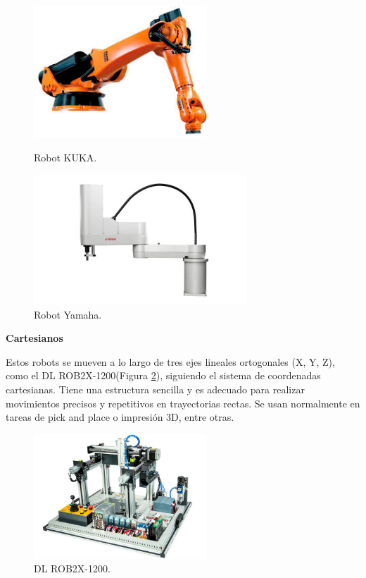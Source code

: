 \begin{figure}[h!]
  \begin{minipage}{0.48\textwidth}
    \centering
    \includegraphics[width=6.5cm]{figs/kuka}
    \caption{Robot KUKA.}
    \label{fig:kuka}
  \end{minipage}
  \hfill
  \begin{minipage}{0.48\textwidth}
    \centering
    \includegraphics[width=8cm]{figs/yamaha}
    \caption{Robot Yamaha.} 
    \label{fig:yamaha}
  \end{minipage}
\end{figure}

\noindent\textbf{Cartesianos} 

Estos robots se mueven a lo largo de tres ejes lineales ortogonales (X, Y, Z), como el DL ROB2X-1200(Figura \ref{fig:cartesiano}), siguiendo el sistema de coordenadas cartesianas. Tiene una estructura sencilla y es adecuado para realizar movimientos precisos y repetitivos en trayectorias rectas. Se usan normalmente en tareas de pick and place o impresión 3D, entre otras.
 


\begin{figure} [h!]
  \begin{center}
    \includegraphics[width=6.5cm]{figs/cartesiano}
  \end{center}
  \caption{DL ROB2X-1200.}
  \label{fig:cartesiano}
\end{figure}\

